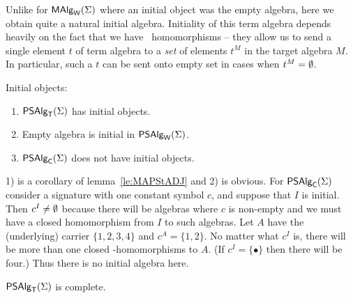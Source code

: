 \documentclass[10pt]{article}
\begin{document}
Unlike for $\mbox{\rm\sf MAlg}_{\sf W}(\Sigma)$ where an initial object was the empty algebra, here
we obtain quite a natural initial algebra. Initiality of this term
algebra depends heavily on the fact that we have \PS\ homomorphisms --
they allow us to send a single element $t$ of term algebra to a {\em
set} of elements $t^M$ in the target algebra $M$. In particular, such
a $t$ can be sent onto empty set in cases when $t^M=\emptyset$.

\begin{Fact}
Initial objects:
\begin{enumerate}\MyLPar
\item
$\mbox{\sf PSAlg}_{\sf T}(\Sigma)$ has initial objects.
\item 
Empty algebra is initial in $\mbox{\sf PSAlg}_{\sf W}(\Sigma)$.
\item
$\mbox{\sf PSAlg}_{\sf C}(\Sigma)$ does not have initial objects.
\end{enumerate}
\end{Fact}

\begin{Proof}
1) is a corollary of lemma~\ref{le:MAPStADJ} and 2) is obvious.  For
$\mbox{\sf PSAlg}_{\sf C}(\Sigma)$ consider a signature with one constant symbol $c$, and
suppose that $I$ is initial. Then $c^I\not=\emptyset$ because there will be
algebras where $c$ is non-empty and we must have a closed homomorphism
from $I$ to such algebras. Let $A$ have the (underlying) carrier
$\{1,2,3,4\}$ and $c^A=\{1,2\}$. No matter what $c^I$ is, there will
be more than one closed \PS-homomorphisms to $A$. (If
$c^I=\{\bullet\}$ then there will be four.) Thus there is no initial
algebra here.
\end{Proof}

\begin{Theorem}
\label{th:MAPStcmpl}
$\mbox{\sf PSAlg}_{\sf T}(\Sigma)$ is complete.
\end{Theorem}
\end{document}
